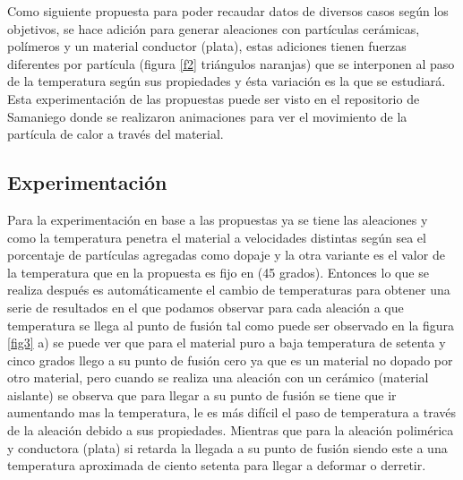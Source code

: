 \documentclass[3pt,twocolumn]{elsarticle}
\begin{document}
Como siguiente propuesta para poder recaudar datos de diversos casos según los objetivos, se hace adición para generar aleaciones con partículas cerámicas, polímeros y un material conductor (plata), estas adiciones tienen fuerzas diferentes por partícula (figura \ref{f2} triángulos naranjas) que se interponen al paso de la temperatura según sus propiedades y ésta variación es la que se estudiará. Esta experimentación de las propuestas puede ser visto en el repositorio de Samaniego \cite{Edson} donde se realizaron animaciones \cite{GIPHY} para ver el movimiento de la partícula de calor a través del material.

\subsection{Experimentación}
Para la experimentación en base a las propuestas ya se tiene las aleaciones y como la temperatura penetra el material a velocidades distintas según sea el porcentaje de partículas agregadas como dopaje y la otra variante es el valor de la temperatura que en la propuesta es fijo en (45 grados). Entonces lo que se realiza después es automáticamente el cambio de temperaturas para obtener una serie de resultados en el que podamos observar para cada aleación a que temperatura se llega al punto de fusión tal como puede ser observado en la figura \ref{fig3} a) se puede ver que para el material puro a baja temperatura de setenta y cinco grados llego a su punto de fusión cero ya que es un material no dopado por otro material, pero cuando se realiza una aleación con un cerámico (material aislante) se observa que para llegar a su punto de fusión se tiene que ir aumentando mas la temperatura, le es más difícil el paso de temperatura a través de la aleación debido a sus propiedades. Mientras que para la aleación polimérica y conductora (plata) si retarda la llegada a su punto de fusión siendo este a una temperatura aproximada de ciento setenta para llegar a deformar o derretir.
\end{document}
